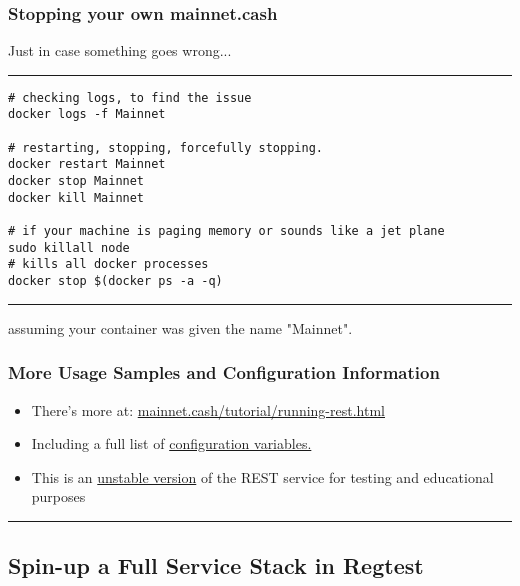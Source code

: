 \documentclass{beamer}
\begin{document}
\begin{frame}[fragile]
    \frametitle{Stopping your own mainnet.cash}
      Just in case something \alert{goes wrong}...
    \rule{\textwidth}{0.6pt}
    \tiny
    \begin{verbatim}
# checking logs, to find the issue
docker logs -f Mainnet

# restarting, stopping, forcefully stopping.
docker restart Mainnet
docker stop Mainnet
docker kill Mainnet

# if your machine is paging memory or sounds like a jet plane
sudo killall node 
# kills all docker processes
docker stop $(docker ps -a -q)
    \end{verbatim}
\rule{\textwidth}{0.6pt}
assuming your container was given the name "Mainnet".\\
\end{frame}

\begin{frame}[fragile]
    \frametitle{More Usage Samples and Configuration Information}
  \begin{itemize}
    \item
      There's more at: \href{https://mainnet.cash/tutorial/running-rest.html}{mainnet.cash/tutorial/running-rest.html}
    \item
      Including a full list of \href{https://mainnet.cash/tutorial/running-rest.html#configuration}{configuration variables.}
    \item
      This is an \href{https://rest-unstable.mainnet.cash/api-docs/}{unstable version} of the REST service for testing and educational purposes
    \end{itemize}
        
\rule{\textwidth}{0.9pt}
\end{frame}

\subsection[RegTest Stack]{Spin-up a Full Service Stack in Regtest}
\end{document}
